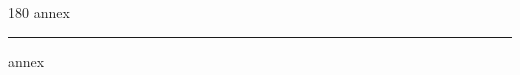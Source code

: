 
\begin{frame}
\begin{center}
\begin{turn}{180}
{\fontsize{2.5cm}{1em}\selectfont annex}
\end{turn}
\vspace{1em}\par  
\hrule
\vspace{1em}\par  
{\fontsize{2.5cm}{1em}\selectfont annex}
\end{center}
\end{frame}
